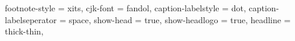 {{    footnote-style = xits,
    cjk-font = fandol,
    caption-labelstyle = dot,
    caption-labelseperator = space,
    show-head = true,
    show-headlogo = true,
    headline = thick-thin,
}}
